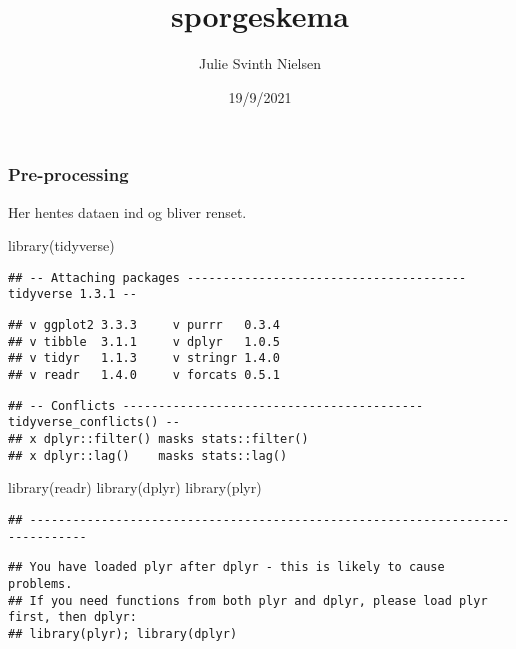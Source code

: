 \documentclass[
]{article}
\title{sporgeskema}
\author{Julie Svinth Nielsen}
\date{19/9/2021}
\newenvironment{Shaded}{\begin{snugshade}}{\end{snugshade}}
\newcommand{\FunctionTok}[1]{\textcolor[rgb]{0.00,0.00,0.00}{#1}}
\newcommand{\NormalTok}[1]{#1}
\begin{document}
\maketitle

\hypertarget{pre-processing}{%
\subsubsection{Pre-processing}\label{pre-processing}}

Her hentes dataen ind og bliver renset.

\begin{Shaded}
\begin{Highlighting}[]
\FunctionTok{library}\NormalTok{(tidyverse)}
\end{Highlighting}
\end{Shaded}

\begin{verbatim}
## -- Attaching packages --------------------------------------- tidyverse 1.3.1 --
\end{verbatim}

\begin{verbatim}
## v ggplot2 3.3.3     v purrr   0.3.4
## v tibble  3.1.1     v dplyr   1.0.5
## v tidyr   1.1.3     v stringr 1.4.0
## v readr   1.4.0     v forcats 0.5.1
\end{verbatim}

\begin{verbatim}
## -- Conflicts ------------------------------------------ tidyverse_conflicts() --
## x dplyr::filter() masks stats::filter()
## x dplyr::lag()    masks stats::lag()
\end{verbatim}

\begin{Shaded}
\begin{Highlighting}[]
\FunctionTok{library}\NormalTok{(readr)}
\FunctionTok{library}\NormalTok{(dplyr)}
\FunctionTok{library}\NormalTok{(plyr)}
\end{Highlighting}
\end{Shaded}

\begin{verbatim}
## ------------------------------------------------------------------------------
\end{verbatim}

\begin{verbatim}
## You have loaded plyr after dplyr - this is likely to cause problems.
## If you need functions from both plyr and dplyr, please load plyr first, then dplyr:
## library(plyr); library(dplyr)
\end{verbatim}
\end{document}
